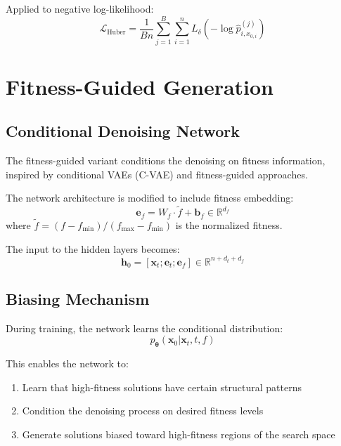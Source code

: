 \documentclass[11pt,a4paper]{article}
\newcommand{\R}{\mathbb{R}}
\newcommand{\vx}{\mathbf{x}}
\newcommand{\vtheta}{\boldsymbol{\theta}}
\begin{document}
Applied to negative log-likelihood:
\begin{equation}
    \mathcal{L}_{\text{Huber}} = \frac{1}{Bn}\sum_{j=1}^{B}\sum_{i=1}^{n} L_\delta\left(-\log \hat{p}_{i,x_{0,i}}^{(j)}\right)
\end{equation}

\section{Fitness-Guided Generation}

\subsection{Conditional Denoising Network}

The fitness-guided variant conditions the denoising on fitness information, inspired by conditional VAEs (C-VAE) and fitness-guided approaches.

The network architecture is modified to include fitness embedding:
\begin{equation}
    \mathbf{e}_f = W_f \cdot \tilde{f} + \mathbf{b}_f \in \R^{d_f}
\end{equation}
where $\tilde{f} = (f - f_{\min})/(f_{\max} - f_{\min})$ is the normalized fitness.

The input to the hidden layers becomes:
\begin{equation}
    \mathbf{h}_0 = [\vx_t; \mathbf{e}_t; \mathbf{e}_f] \in \R^{n + d_t + d_f}
\end{equation}

\subsection{Biasing Mechanism}

During training, the network learns the conditional distribution:
\begin{equation}
    p_\vtheta(\vx_0 | \vx_t, t, f)
\end{equation}

This enables the network to:
\begin{enumerate}
    \item Learn that high-fitness solutions have certain structural patterns
    \item Condition the denoising process on desired fitness levels
    \item Generate solutions biased toward high-fitness regions of the search space
\end{enumerate}
\end{document}
